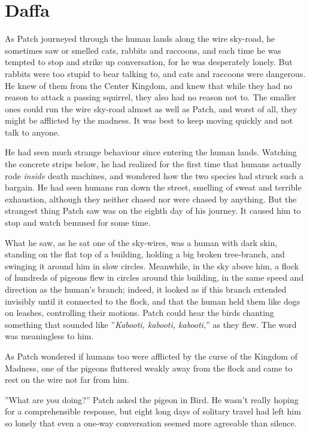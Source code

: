 \documentclass[12pt]{book}
\begin{document}
\section{Daffa}

As Patch journeyed through the human lands along the wire sky-road, he sometimes saw or smelled cats, rabbits and raccoons, and each time he was tempted to stop and strike up conversation, for he was desperately lonely. But rabbits were too stupid to bear talking to, and cats and raccoons were dangerous. He knew of them from the Center Kingdom, and knew that while they had no reason to attack a passing squirrel, they also had no reason not to. The smaller ones could run the wire sky-road almost as well as Patch, and worst of all, they might be afflicted by the madness. It was best to keep moving quickly and not talk to anyone.\par
 He had seen much strange behaviour since entering the human lands. Watching the concrete strips below, he had realized for the first time that humans actually rode {\it inside} death machines, and wondered how the two species had struck such a bargain. He had seen humans run down the street, smelling of sweat and terrible exhaustion, although they neither chased nor were chased by anything. But the strangest thing Patch saw was on the eighth day of his journey. It caused him to stop and watch bemused for some time.\par
 What he saw, as he sat one of the sky-wires, was a human with dark skin, standing on the flat top of a building, holding a big broken tree-branch, and swinging it around him in slow circles. Meanwhile, in the sky above him, a flock of hundreds of pigeons flew in circles around this building, in the same speed and direction as the human's branch; indeed, it looked as if this branch extended invisibly until it connected to the flock, and that the human held them like dogs on leashes, controlling their motions. Patch could hear the birds chanting something that sounded like ''{\it Kabooti, kabooti, kabooti,}'' as they flew. The word was meaningless to him.\par
As Patch wondered if humans too were afflicted by the curse of the Kingdom of Madness, one of the pigeons fluttered weakly away from the flock and came to rest on the wire not far from him.\par
 ''What are you doing?'' Patch asked the pigeon in Bird. He wasn't really hoping for a comprehensible response, but eight long days of solitary travel had left him so lonely that even a one-way conversation seemed more agreeable than silence.\par
\end{document}

